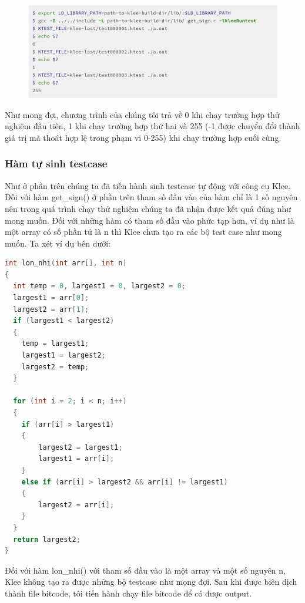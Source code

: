\documentclass[12pt,a4paper]{article}
\begin{document}
\begin{figure}[ht]
\begin{center}
\includegraphics[scale=.3]{hinhanh/replayingtestcase.png}
\end{center}
\end{figure}

Như mong đợi, chương trình của chúng tôi trả về 0 khi chạy trường hợp thử nghiệm đầu tiên, 1 khi chạy trường hợp thứ hai và 255 (-1 được chuyển đổi thành giá trị mã thoát hợp lệ trong phạm vi 0-255) khi chạy trường hợp cuối cùng.

\subsubsection{Hàm tự sinh testcase}
Như ở phần trên chúng ta đã tiến hành sinh testcase tự động với công cụ Klee. Đối với hàm get\_sign() ở phần trên tham số đầu vào của hàm chỉ là 1 số nguyên nên trong quá trình chạy thử nghiệm chúng ta đã nhận được kết quả đúng như mong muốn.  Đối với những hàm có tham số đầu vào phức tạp hơn, ví dụ như là một array có số phần tử là n thì Klee chưa tạo ra các bộ test case như  mong muốn. Ta xét ví dụ bên dưới:

\begin{lstlisting}[language=c]
int lon_nhi(int arr[], int n)
{
  int temp = 0, largest1 = 0, largest2 = 0;
  largest1 = arr[0];
  largest2 = arr[1];
  if (largest1 < largest2)
  { 
    temp = largest1;
    largest1 = largest2;
    largest2 = temp;
  }
  
  for (int i = 2; i < n; i++)
  { 
    if (arr[i] > largest1)
    {   
        largest2 = largest1;
        largest1 = arr[i];
    }
    else if (arr[i] > largest2 && arr[i] != largest1)
    {   
        largest2 = arr[i];
    }
  }
  return largest2;
}
\end{lstlisting}

Đối với hàm lon\_nhi() với tham số đầu vào là một array và một số nguyên n, Klee không tạo ra được những bộ testcase như mọng đợi. \newpage Sau khi được biên dịch thành file bitcode, tôi tiến hành chạy file bitcode để có được output.
\end{document}

